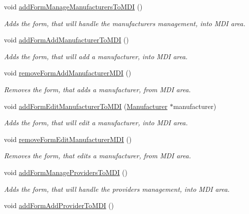 \begin{DoxyCompactItemize}
void \hyperlink{class_main_window_ac16d7f270d6d08e99e06e4ebf3a4e629}{add\-Form\-Manage\-Manufacturers\-To\-M\-D\-I} ()
\begin{DoxyCompactList}\small\item\em \-Adds the form, that will handle the manufacturers management, into \-M\-D\-I area. \end{DoxyCompactList}\item 
void \hyperlink{class_main_window_a75a5c0565e11a88130888b226cc9974a}{add\-Form\-Add\-Manufacturer\-To\-M\-D\-I} ()
\begin{DoxyCompactList}\small\item\em \-Adds the form, that will add a manufacturer, into \-M\-D\-I area. \end{DoxyCompactList}\item 
void \hyperlink{class_main_window_a6e224e552fcfecab22dcb4bd7679e39e}{remove\-Form\-Add\-Manufacturer\-M\-D\-I} ()
\begin{DoxyCompactList}\small\item\em \-Removes the form, that adds a manufacturer, from \-M\-D\-I area. \end{DoxyCompactList}\item 
void \hyperlink{class_main_window_ad80df962c0ea1164831e483adb0e5f7d}{add\-Form\-Edit\-Manufacturer\-To\-M\-D\-I} (\hyperlink{class_manufacturer}{\-Manufacturer} $\ast$manufacturer)
\begin{DoxyCompactList}\small\item\em \-Adds the form, that will edit a manufacturer, into \-M\-D\-I area. \end{DoxyCompactList}\item 
void \hyperlink{class_main_window_a7fb993091418252721335791be86e1d7}{remove\-Form\-Edit\-Manufacturer\-M\-D\-I} ()
\begin{DoxyCompactList}\small\item\em \-Removes the form, that edits a manufacturer, from \-M\-D\-I area. \end{DoxyCompactList}\item 
void \hyperlink{class_main_window_a13351108025ba4832476c7ffa60180a3}{add\-Form\-Manage\-Providers\-To\-M\-D\-I} ()
\begin{DoxyCompactList}\small\item\em \-Adds the form, that will handle the providers management, into \-M\-D\-I area. \end{DoxyCompactList}\item 
void \hyperlink{class_main_window_a065373d448a19ff2cc71aa9257a1d3be}{add\-Form\-Add\-Provider\-To\-M\-D\-I} ()

\end{DoxyCompactItemize}
